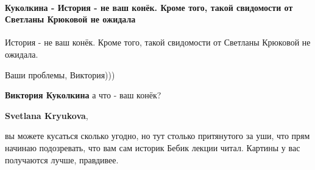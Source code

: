  
 
 
 
 
\paragraph{Куколкина - История - не ваш конёк. Кроме того, такой свидомости от Светланы Крюковой не ожидала}

\begin{itemize}
 
История - не ваш конёк. Кроме того, такой свидомости от Светланы Крюковой не ожидала.

\begin{itemize}
 
Ваши проблемы, Виктория)))


 
\textbf{Виктория Куколкина} а что - ваш конёк?

 
\textbf{Svetlana Kryukova}, 

вы можете кусаться сколько угодно, но тут столько притянутого за уши, что прям
начинаю подозревать, что вам сам историк Бебик лекции читал. Картины у вас
получаются лучше, правдивее.

 

\end{itemize}
\end{itemize}
